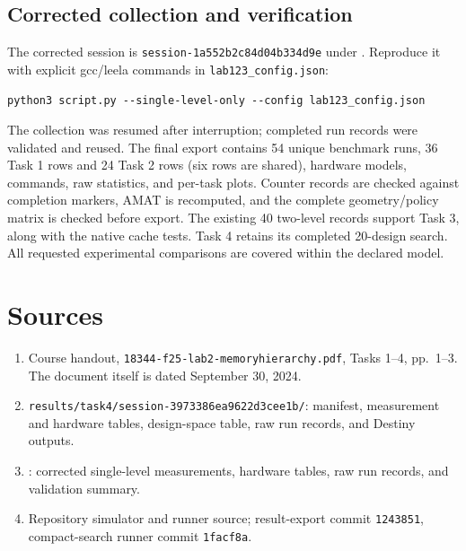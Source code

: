 \documentclass[10pt,letterpaper]{article}
\begin{document}
\subsection{Corrected collection and verification}
The corrected session is \texttt{session-1a552b2c84d04b334d9e} under
. Reproduce it with explicit gcc/leela commands
in \texttt{lab123\_config.json}:
\begin{verbatim}
python3 script.py --single-level-only --config lab123_config.json
\end{verbatim}
The collection was resumed after interruption; completed run records were
validated and reused. The final export contains 54 unique benchmark runs,
36 Task 1 rows and 24 Task 2 rows (six rows are shared), hardware models,
commands, raw statistics, and per-task plots. Counter records are checked against
completion markers, AMAT is recomputed, and the complete geometry/policy matrix
is checked before export. The existing 40 two-level records support Task 3,
along with the native cache tests. Task 4 retains its completed 20-design search.
All requested experimental comparisons are covered within the declared model.

\section*{Sources}
\begin{enumerate}
\item Course handout, \texttt{18344-f25-lab2-memoryhierarchy.pdf}, Tasks 1--4,
pp.~1--3. The document itself is dated September 30, 2024.
\item \texttt{results/task4/session-3973386ea9622d3cee1b/}: manifest, measurement
and hardware tables, design-space table, raw run records, and Destiny outputs.
\item {}: corrected single-level measurements,
hardware tables, raw run records, and validation summary.
\item Repository simulator and runner source; result-export commit
\texttt{1243851}, compact-search runner commit \texttt{1facf8a}.
\end{enumerate}
\end{document}
